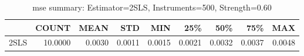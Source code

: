 \begin{table}[ht]
\centering
\caption{mse summary: Estimator=2SLS, Instruments=500, Strength=0.60}
\begin{tabular}{lrrrrrrrr}
\toprule
 & COUNT & MEAN & STD & MIN & 25\% & 50\% & 75\% & MAX \\
\midrule
2SLS & 10.0000 & 0.0030 & 0.0011 & 0.0015 & 0.0021 & 0.0032 & 0.0037 & 0.0048 \\
\bottomrule
\end{tabular}
\end{table}
